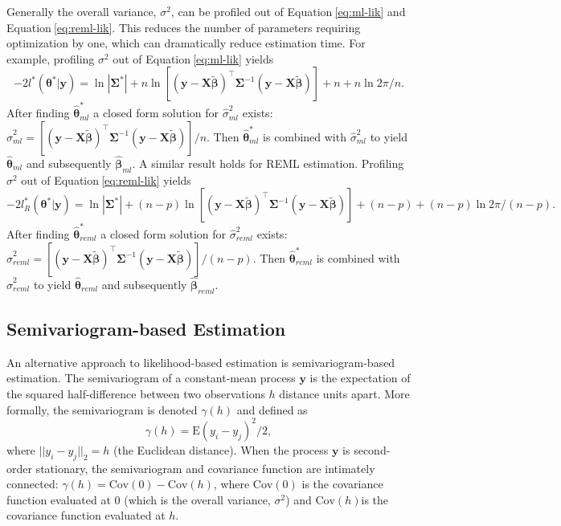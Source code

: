 \documentclass{article}
\begin{document}
Generally the overall variance, \(\sigma^2\), can be profiled out of
Equation\(~\)\ref{eq:ml-lik} and Equation\(~\)\ref{eq:reml-lik}. This
reduces the number of parameters requiring optimization by one, which
can dramatically reduce estimation time. For example, profiling
\(\sigma^2\) out of Equation\(~\)\ref{eq:ml-lik} yields
\begin{equation}\label{eq:ml-plik}
  -2l^*(\bm{\theta}^* | \mathbf{y}) = \ln{|\mathbf{\Sigma^*}|} + n\ln[(\mathbf{y} - \mathbf{X} \tilde{\bm{\beta}})^\intercal \mathbf{\Sigma}^{-1} (\mathbf{y} - \mathbf{X} \tilde{\bm{\beta}})] + n + n\ln{2\pi / n}.
\end{equation} After finding \(\hat{\bm{\theta}}^*_{ml}\) a closed form
solution for \(\hat{\sigma}^2_{ml}\) exists:
\(\hat{\sigma}^2_{ml} = [(\mathbf{y} - \mathbf{X} \bm{\tilde{\beta}})^\intercal \mathbf{\Sigma}^{-1} (\mathbf{y} - \mathbf{X} \tilde{\bm{\beta}})] / n\).
Then \(\bm{\hat{\theta}}^*_{ml}\) is combined with
\(\hat{\sigma}^2_{ml}\) to yield \(\bm{\hat{\theta}}_{ml}\) and
subsequently \(\bm{\hat{\beta}}_{ml}\). A similar result holds for REML
estimation. Profiling \(\sigma^2\) out of Equation\(~\)\ref{eq:reml-lik}
yields \begin{equation}\label{eq:reml-plik}
  -2l_R^*(\bm{\theta}^* | \mathbf{y}) = \ln{|\mathbf{\Sigma^*}|} + (n - p)\ln[(\mathbf{y} - \mathbf{X} \tilde{\bm{\beta}})^\intercal \mathbf{\Sigma}^{-1} (\mathbf{y} - \mathbf{X} \tilde{\bm{\beta}})] + (n - p) + (n - p)\ln2\pi / (n - p).
\end{equation} After finding \(\hat{\bm{\theta}}^*_{reml}\) a closed
form solution for \(\hat{\sigma}^2_{reml}\) exists:
\(\hat{\sigma}^2_{reml} = [(\mathbf{y} - \mathbf{X} \bm{\tilde{\beta}})^\intercal \mathbf{\Sigma}^{-1} (\mathbf{y} - \mathbf{X} \tilde{\bm{\beta}})] / (n - p)\).
Then \(\bm{\hat{\theta}}^*_{reml}\) is combined with
\(\hat{\sigma}^2_{reml}\) to yield \(\bm{\hat{\theta}}_{reml}\) and
subsequently \(\bm{\hat{\beta}}_{reml}\).

\hypertarget{semivariogram-based-estimation}{%
\subsection{Semivariogram-based
Estimation}\label{semivariogram-based-estimation}}

An alternative approach to likelihood-based estimation is
semivariogram-based estimation. The semivariogram of a constant-mean
process \(\mathbf{y}\) is the expectation of the squared half-difference
between two observations \(h\) distance units apart. More formally, the
semivariogram is denoted \(\gamma(h)\) and defined as
\begin{equation}\label{eq:sv}
  \gamma(h) = \text{E}(y_i - y_j)^2 / 2 ,
\end{equation} where \(||y_i - y_j||_2 = h\) (the Euclidean distance).
When the process \(\mathbf{y}\) is second-order stationary, the
semivariogram and covariance function are intimately connected:
\(\gamma(h) = \text{Cov}(0) - \text{Cov}(h)\), where \(\text{Cov}(0)\)
is the covariance function evaluated at 0 (which is the overall
variance, \(\sigma^2\)) and \(\text{Cov}(h)\)is the covariance function
evaluated at \(h\).
\end{document}
